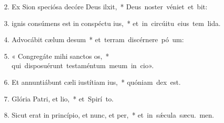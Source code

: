 \begin{flushleft}
\begin{enumerate}[leftmargin=*]
\setcounter{enumi}{1}

\item Ex Sion speciósa decóre Deus ilxit,~* \mbox{Deus noster véniet et  bit:}

\item ignis consúmens est in conspéctu ius,~* \mbox{et in circúitu eius tem lida.}

\item Advocábit cælum desum~* \mbox{et terram discérnere pó um:}

\item « Congregáte mihi sanctos os,~* \mbox{qui disposuérunt testaméntum meum in cio».}

\item Et annuntiábunt cæli iustítiam ius,~* \mbox{quóniam  dex est.}

\item Glória Patri, et lio,~* \mbox{et Spirí to.}

\item Sicut erat in princípio, et nunc, et per,~* \mbox{et in s\'{\ae}cula sæcu. men.}

\end{enumerate}
\end{flushleft}

